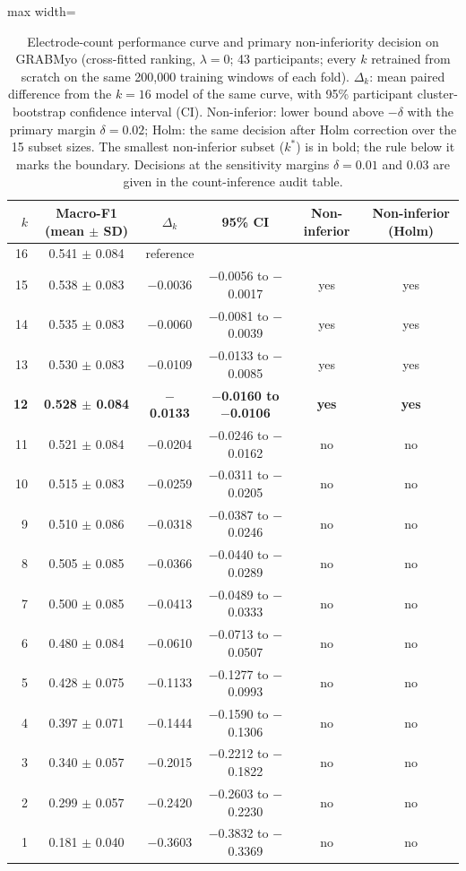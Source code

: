 \begin{table}[t]
\centering
\small
\caption{Electrode-count performance curve and primary non-inferiority decision on GRABMyo (cross-fitted ranking, $\lambda = 0$; 43 participants; every $k$ retrained from scratch on the same 200,000 training windows of each fold). $\Delta_k$: mean paired difference from the $k = 16$ model of the same curve, with 95\% participant cluster-bootstrap confidence interval (CI). Non-inferior: lower bound above $-\delta$ with the primary margin $\delta = 0.02$; Holm: the same decision after Holm correction over the 15 subset sizes. The smallest non-inferior subset ($k^*$) is in bold; the rule below it marks the boundary. Decisions at the sensitivity margins $\delta = 0.01$ and 0.03 are given in the count-inference audit table.}
\label{tab:sparse_ni}
\setlength{\tabcolsep}{4pt}
\begin{adjustbox}{max width=\textwidth}
\begin{tabular}{rccccc}
\toprule
$k$ & Macro-F1 (mean $\pm$ SD) & $\Delta_k$ & 95\% CI & Non-inferior & Non-inferior (Holm) \\
\midrule
16 & 0.541 $\pm$ 0.084 & reference &  &  &  \\
15 & 0.538 $\pm$ 0.083 & $-$0.0036 & $-$0.0056 to $-$0.0017 & yes & yes \\
14 & 0.535 $\pm$ 0.083 & $-$0.0060 & $-$0.0081 to $-$0.0039 & yes & yes \\
13 & 0.530 $\pm$ 0.083 & $-$0.0109 & $-$0.0133 to $-$0.0085 & yes & yes \\
\textbf{12} & \textbf{0.528 $\pm$ 0.084} & \textbf{$-$0.0133} & \textbf{$-$0.0160 to $-$0.0106} & \textbf{yes} & \textbf{yes} \\
\midrule 11 & 0.521 $\pm$ 0.084 & $-$0.0204 & $-$0.0246 to $-$0.0162 & no & no \\
10 & 0.515 $\pm$ 0.083 & $-$0.0259 & $-$0.0311 to $-$0.0205 & no & no \\
9 & 0.510 $\pm$ 0.086 & $-$0.0318 & $-$0.0387 to $-$0.0246 & no & no \\
8 & 0.505 $\pm$ 0.085 & $-$0.0366 & $-$0.0440 to $-$0.0289 & no & no \\
7 & 0.500 $\pm$ 0.085 & $-$0.0413 & $-$0.0489 to $-$0.0333 & no & no \\
6 & 0.480 $\pm$ 0.084 & $-$0.0610 & $-$0.0713 to $-$0.0507 & no & no \\
5 & 0.428 $\pm$ 0.075 & $-$0.1133 & $-$0.1277 to $-$0.0993 & no & no \\
4 & 0.397 $\pm$ 0.071 & $-$0.1444 & $-$0.1590 to $-$0.1306 & no & no \\
3 & 0.340 $\pm$ 0.057 & $-$0.2015 & $-$0.2212 to $-$0.1822 & no & no \\
2 & 0.299 $\pm$ 0.057 & $-$0.2420 & $-$0.2603 to $-$0.2230 & no & no \\
1 & 0.181 $\pm$ 0.040 & $-$0.3603 & $-$0.3832 to $-$0.3369 & no & no \\
\bottomrule
\end{tabular}
\end{adjustbox}
\end{table}
